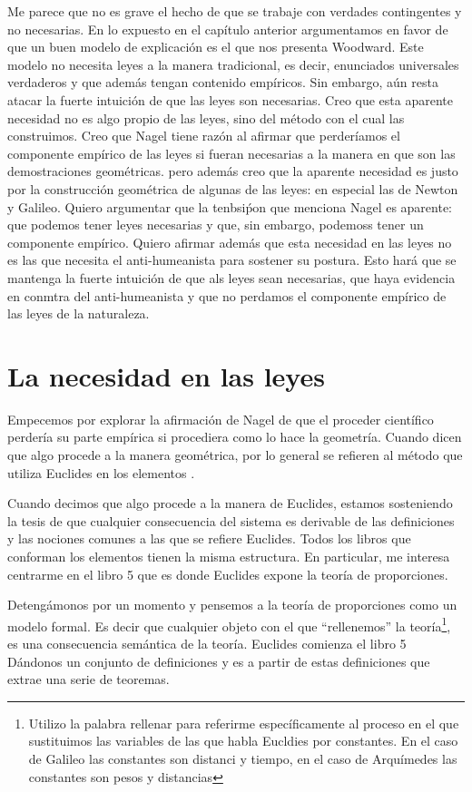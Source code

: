 Me parece que no es grave el hecho de que se trabaje con verdades contingentes y no necesarias. En lo expuesto en el capítulo anterior argumentamos en favor de que un buen modelo de explicación es el que nos presenta Woodward. Este modelo no necesita leyes a la manera tradicional, es decir, enunciados universales verdaderos y que además tengan contenido empíricos. Sin embargo, aún resta atacar la fuerte intuición de que las leyes son necesarias. Creo que esta aparente necesidad no es algo propio de las leyes, sino del método con el cual las construimos. Creo que Nagel tiene razón al afirmar que perderíamos el componente empírico de las leyes si fueran necesarias a la manera en que son las demostraciones geométricas. pero además creo que la aparente necesidad es justo por la construcción geométrica de algunas de las leyes: en especial las de Newton y Galileo. Quiero argumentar que la tenbsiṕon que menciona Nagel es aparente: que podemos tener leyes necesarias y que, sin embargo, podemoss tener un componente empírico. Quiero afirmar además que esta necesidad en las leyes no es las que necesita el anti-humeanista para sostener su postura. Esto hará que se mantenga la fuerte intuición de que als leyes sean necesarias, que haya evidencia en conmtra del anti-humeanista y que no perdamos el componente empírico de las leyes de la naturaleza.

\section{La necesidad en las leyes}

\noindent Empecemos por explorar la afirmación de Nagel de que el proceder científico perdería su parte empírica si procediera como lo hace la geometría. Cuando dicen que algo procede a la manera geométrica, por lo general se refieren al método que utiliza Euclides en los elementos \cite{Euclid2008}.

Cuando decimos que algo procede a la manera de Euclides, estamos sosteniendo la tesis de que cualquier consecuencia del sistema es derivable de las definiciones y las nociones comunes a las que se refiere Euclides. Todos los libros que conforman los elementos tienen la misma estructura. En particular, me interesa centrarme en el libro 5 que es donde Euclides expone la teoría de proporciones.

Detengámonos por un momento y pensemos a la teoría de proporciones como un modelo formal. Es decir que cualquier objeto con el que ``rellenemos'' la teoría\footnote{Utilizo la palabra rellenar para referirme específicamente al proceso en el que sustituimos las variables de las que habla Eucldies por constantes. En el caso de Galileo las constantes son distanci y tiempo, en el caso de Arquímedes las constantes son pesos y distancias}, es una consecuencia semántica de la teoría. Euclides comienza el libro 5 Dándonos un conjunto de definiciones y es a partir de estas definiciones que extrae una serie de teoremas.

